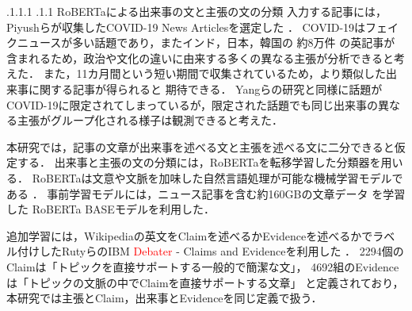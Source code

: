 \documentclass[a4paper, twocolumn, 10pt]{jarticle}
\makeatletter
\def\subsection{%
	\@startsection{subsection}{1}{\z@}%
	{.1\Cvs \@plus.1\Cdp \@minus.1\Cdp}%
	{.1\Cvs \@plus.1\Cdp}%
	{\normalfont\normalsize\bfseries}%
}
\makeatother
\begin{document}
\subsection{RoBERTaによる出来事の文と主張の文の分類}
入力する記事には，Piyushらが収集したCOVID-19 News Articlesを選定した
．
COVID-19はフェイクニュースが多い話題であり，またインド，日本，韓国の
約8万件
の英記事が含まれるため，政治や文化の違いに由来する多くの異なる主張が分析できると考えた．
また，11カ月間という短い期間で収集されているため，より類似した出来事に関する記事が得られると
期待できる．
Yangらの研究と同様に話題がCOVID-19に限定されてしまっているが，限定された話題でも同じ出来事の異なる主張がグループ化される様子は観測できると考えた．

本研究では，記事の文章が出来事を述べる文と主張を述べる文に二分できると仮定する．
出来事と主張の文の分類には，RoBERTaを転移学習した分類器を用いる．
RoBERTaは文意や文脈を加味した自然言語処理が可能な機械学習モデルである
．
事前学習モデルには，ニュース記事を含む約160GBの文章データ
を学習した
RoBERTa BASEモデルを利用した．

追加学習には，Wikipediaの英文をClaimを述べるかEvidenceを述べるかでラベル付けしたRutyらのIBM \textcolor{red}{Debater} - Claims and Evidenceを利用した
．
2294個のClaimは「トピックを直接サポートする一般的で簡潔な文」，
4692組のEvidenceは「トピックの文脈の中でClaimを直接サポートする文章」
と定義されており，本研究では主張とClaim，出来事とEvidenceを同じ定義で扱う．

\end{document}
